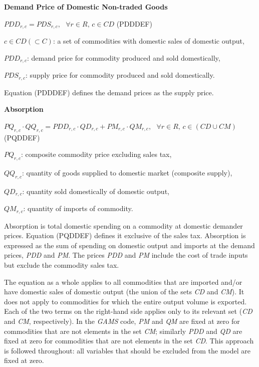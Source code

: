 \documentclass[10pt,a4paper,titlepage,dvipdfmx]{book}
\begin{document}
\begin{flushleft}\textbf{Demand Price of Domestic Non-traded Goods}\end{flushleft}


\begin{center}$PDD_{r,c}=PDS_{r,c},\,\,\,\,\forall r\in R,\,c\in CD$ (PDDDEF)
\end{center}

\begin{flushleft}
$c\in CD\left(\subset C\right)$: a set of commodities with domestic sales of domestic output,

$PDD_{r,c}$: demand price for commodity produced and sold domestically,

$PDS_{r,c}$: supply price for commodity produced and sold domestically. 
\end{flushleft}

Equation (PDDDEF) defines the demand prices as the supply price.

\begin{flushleft}\textbf{Absorption}\end{flushleft}


\begin{center}$PQ_{r,c}\cdot QQ_{r,c}=PDD_{r,c}\cdot QD_{r,c}+PM_{r,c}\cdot QM_{r,c},\,\,\,\,\forall r\in R,\,c\in \left(CD\cup CM\right)$ (PQDDEF)
\end{center}
\begin{flushleft}
$PQ_{r,c}$: composite commodity price excluding sales tax,

$QQ_{r,c}$: quantity of goods supplied to domestic market (composite supply),

$QD_{r,c}$: quantity sold domestically of domestic output,

$QM_{r,c}$: quantity of imports of commodity.
\end{flushleft}

Absorption is total domestic spending on a commodity at domestic demander prices. Equation (PQDDEF) defines it exclusive of the sales tax. Absorption is expressed as the sum of spending on domestic output and imports at the demand prices, \textit{PDD} and \textit{PM}. The prices \textit{PDD} and \textit{PM} include the cost of trade inputs but exclude the commodity sales tax.

The equation as a whole applies to all commodities that are imported and/or have domestic sales of domestic output (the union of the sets \textit{CD} and \textit{CM}). It does not apply to commodities for which the entire output volume is exported. Each of the two terms on the right-hand side applies only to its relevant set (\textit{CD} and \textit{CM}, respectively). In the \textit{GAMS} code, \textit{PM} and \textit{QM} are fixed at zero for commodities that are not elements in the set \textit{CM}; similarly \textit{PDD} and \textit{QD} are fixed at zero for commodities that are not elements in the set \textit{CD}. This approach is followed throughout: all variables that should be excluded from the model are fixed at zero. 
\end{document}
